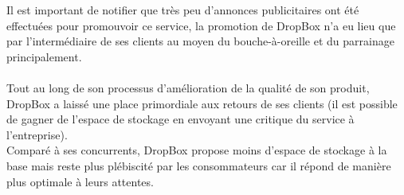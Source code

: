 \documentclass[a4paper, 10pt]{article}
\begin{document}
Il est important de notifier que très peu d'annonces publicitaires ont été effectuées pour promouvoir ce service,
la promotion de DropBox n'a eu lieu que par l'intermédiaire de ses clients au moyen du bouche-à-oreille et du parrainage principalement.\\ \\
Tout au long de son processus d'amélioration de la qualité de son produit, DropBox a laissé une place primordiale aux retours de ses clients
(il est possible de gagner de l'espace de stockage en envoyant une critique du service à l'entreprise).\\
Comparé à ses concurrents, DropBox propose moins d'espace de stockage à la base mais reste plus plébiscité par les consommateurs
car il répond de manière plus optimale à leurs attentes.\\ \\
\end{document}
